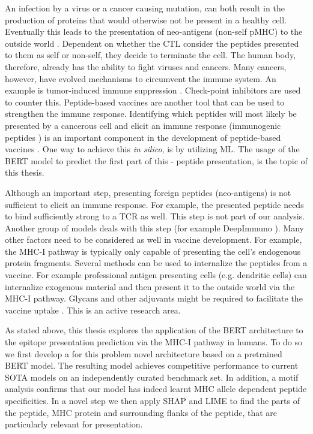 \documentclass[msc,deptreport,ai]{infthesis} %
\begin{document}
An infection by a virus or a cancer causing mutation, can both result in the production of proteins that would otherwise not be present in a healthy cell. Eventually this leads to the presentation of neo-antigens (non-self \gls{pMHC}) to the outside world \cite{schumacher_neoantigens_2015, zhang_neoantigen_2021}. Dependent on whether the \gls{CTL} consider the peptides presented to them as self or non-self, they decide to terminate the cell. The human body, therefore, already has the ability to fight viruses and cancers. Many cancers, however, have evolved mechanisms to circumvent the immune system. An example is tumor-induced immune suppression \cite{fehres_understanding_2014}. Check-point inhibitors are used to counter this. Peptide-based vaccines are another tool that can be used to strengthen the immune response. Identifying which peptides will most likely be presented by a cancerous cell and elicit an immune response (immunogenic peptides \cite{li_deepimmuno_2021}) is an important component in the development of peptide-based vaccines \cite{comber_mhc_2014}. One way to achieve this \textit{in silico}, is by utilizing \gls{ML}. The usage of the \acrshort{BERT} model to predict the first part of this - peptide presentation, is the topic of this thesis. 

Although an important step, presenting foreign peptides (neo-antigens) is not sufficient to elicit an immune response. For example, the presented peptide needs to bind sufficiently strong to a \gls{TCR} as well. This step is not part of our analysis. Another group of models deals with this step (for example DeepImmuno \cite{li_deepimmuno_2021}). Many other factors need to be considered as well in vaccine development. For example, the \gls{MHC-I} pathway is typically only capable of presenting the cell's endogenous protein fragments. Several methods can be used to internalize the peptides from a vaccine. For example professional antigen presenting cells (e.g. dendritic cells) can internalize exogenous material and then present it to the outside world via the \gls{MHC-I} pathway. Glycans and other adjuvants might be required to facilitate the vaccine uptake \cite{fehres_understanding_2014}. This is an active research area.

As stated above, this thesis explores the application of the \acrshort{BERT} architecture to the epitope presentation prediction via the \gls{MHC-I} pathway in humans. To do so we first develop a for this problem novel architecture based on a pretrained \acrshort{BERT} model. The resulting model achieves competitive performance to current \gls{SOTA} models on an independently curated benchmark set. In addition, a motif analysis confirms that our model has indeed learnt \gls{MHC} allele dependent peptide specificities. In a novel step we then apply \acrshort{SHAP} and \acrshort{LIME} to find the parts of the peptide, \gls{MHC} protein and surrounding flanks of the peptide, that are particularly relevant for presentation.
\end{document}
